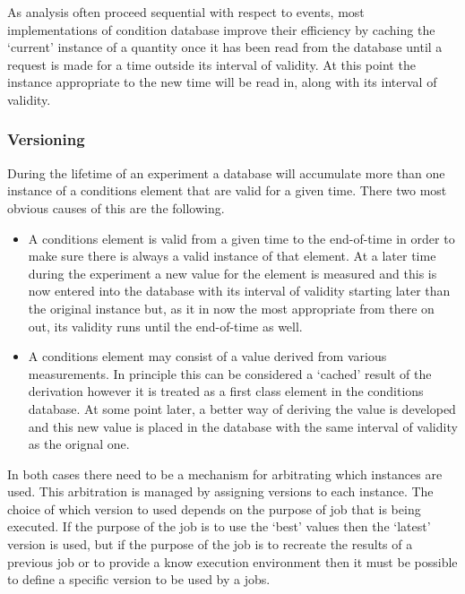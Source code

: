 As analysis often proceed sequential with respect to events, most implementations of condition database improve their efficiency by caching the `current' instance of a quantity once it has been read from the database until a request is made for a time outside its interval of validity. At this point the instance appropriate to the new time will be read in, along with its interval of validity. 


\subsubsection{Versioning}
\label{conditions-versioning}

During the lifetime of an experiment a database will accumulate more than one instance of a conditions element that are valid for a given time. There two most obvious causes of this are the following.

\begin{itemize}
\item A conditions element is valid from a given time to the end-of-time in order to make sure there is always a valid instance of that element. At a later time during the experiment a new value for the element is measured and this is now entered into the database with its interval of validity starting later than the original instance but, as it in now the most appropriate from there on out, its validity runs until the end-of-time as well.

\item A conditions element may consist of a value derived from various measurements. In principle this can be considered a `cached' result of the derivation however it is treated as a first class element in the conditions database. At some point later, a better way of deriving the value is developed and this new value is placed in the database with the same interval of validity as the orignal one.
\end{itemize}

In both cases there need to be a mechanism for arbitrating which instances are used. This arbitration is managed by assigning versions to each instance. The choice of which version to used depends on the purpose of job that is being executed. If the purpose of the job is to use the `best' values then the `latest' version is used, but if the purpose of the job is to recreate the results of a previous job or to provide a know execution environment then it must be possible to define a specific version to be used by a jobs.

